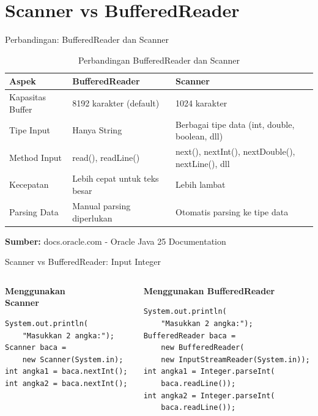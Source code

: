 \documentclass{beamer}
\begin{document}
\section{Scanner vs BufferedReader}
\begin{frame}{Perbandingan:  BufferedReader dan Scanner}
    
  \begin{table}
    \footnotesize
    \begin{tabular}{p{}|p{}|p{}}
    \textbf{Aspek} & \textbf{BufferedReader} & \textbf{Scanner} \\
    \hline
    \rowcolor{lightgray}
    Kapasitas Buffer & 8192 karakter (default) & 1024 karakter \\
    \rowcolor{white}
    Tipe Input & Hanya String & Berbagai tipe data (int, double, boolean, dll) \\
    \rowcolor{lightgray}
    Method Input & read(), readLine() & next(), nextInt(), nextDouble(), nextLine(), dll \\
    \rowcolor{white}
    Kecepatan & Lebih cepat untuk teks besar & Lebih lambat \\
    \rowcolor{lightgray}
    Parsing Data & Manual parsing diperlukan & Otomatis parsing ke tipe data \\
    \end{tabular}
    \caption{Perbandingan BufferedReader dan Scanner}
  \end{table}
  
  \begin{block}{}
    \textbf{Sumber: }docs.oracle.com - Oracle Java 25 Documentation
  \end{block}
\end{frame}
\begin{frame}[fragile]{Scanner vs BufferedReader: Input Integer}
  \begin{columns}
    \begin{column}{0.48\textwidth}
      \textbf{Menggunakan\\Scanner}
      \begin{lstlisting}
System.out.println(
    "Masukkan 2 angka:");
Scanner baca = 
    new Scanner(System.in);
int angka1 = baca.nextInt();
int angka2 = baca.nextInt();




      \end{lstlisting}
    \end{column}
    \begin{column}{0.48\textwidth}
      \textbf{Menggunakan BufferedReader}
      \begin{lstlisting}
System.out.println(
    "Masukkan 2 angka:");
BufferedReader baca = 
    new BufferedReader(
    new InputStreamReader(System.in));
int angka1 = Integer.parseInt(
    baca.readLine());
int angka2 = Integer.parseInt(
    baca.readLine());
      \end{lstlisting}
    \end{column}
  \end{columns}
\end{frame}
\end{document}
